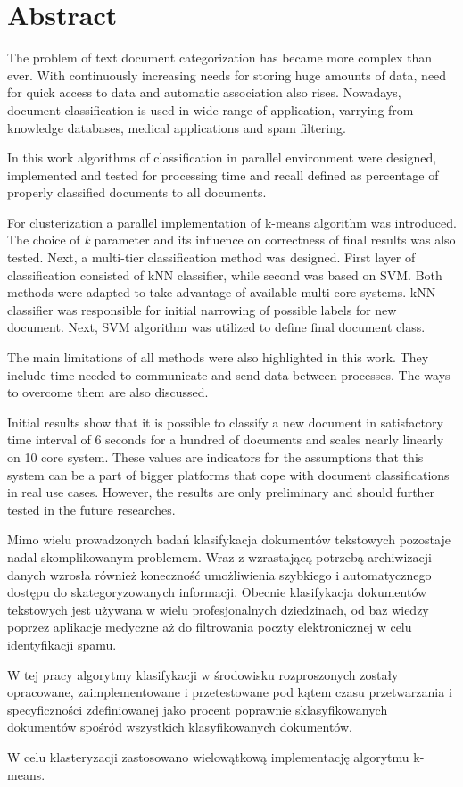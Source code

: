 \chapter*{Abstract}

The problem of text document categorization has became more complex than ever. With continuously increasing needs for storing huge amounts of data, need for quick access to data and automatic association also rises. Nowadays, document classification is used in wide range of application, varrying from knowledge databases, medical applications and spam filtering.

In this work algorithms of classification in parallel environment were designed, implemented and tested for processing time and recall defined as percentage of properly classified documents to all documents. 

For clusterization a parallel implementation of k-means algorithm was introduced. The choice of \textit{k} parameter and its influence on correctness of final results was also tested. Next, a multi-tier classification method was designed. First layer of classification consisted of kNN classifier, while second was based on SVM. Both methods were adapted to take advantage of available multi-core systems. kNN classifier was responsible for initial narrowing of possible labels for new document. Next, SVM algorithm was utilized to define final document class.

The main limitations of all methods were also highlighted in this work. They include time needed to communicate and send data between processes. The ways to overcome them are also discussed.

Initial results show that it is possible to classify a new document in satisfactory time interval of 6 seconds for a hundred of documents and scales nearly linearly on 10 core system. These values are indicators for the assumptions that this system can be a part of bigger platforms that cope with document classifications in real use cases. However, the results are only preliminary and should further tested in the future researches.

Mimo wielu prowadzonych badań klasifykacja dokumentów tekstowych pozostaje nadal skomplikowanym problemem. Wraz z wzrastającą potrzebą archiwizacji danych wzrosła również koneczność umożliwienia szybkiego i automatycznego dostępu do skategoryzowanych informacji. Obecnie klasifykacja dokumentów tekstowych jest używana w wielu profesjonalnych dziedzinach, od baz wiedzy poprzez aplikacje medyczne aż do filtrowania poczty elektronicznej w celu identyfikacji spamu.

W tej pracy algorytmy klasifykacji w środowisku rozproszonych zostały opracowane, zaimplementowane i przetestowane pod kątem czasu przetwarzania i specyficzności zdefiniowanej jako procent poprawnie sklasyfikowanych dokumentów spośród wszystkich klasyfikowanych dokumentów.

W celu klasteryzacji zastosowano wielowątkową implementację algorytmu k-means. 